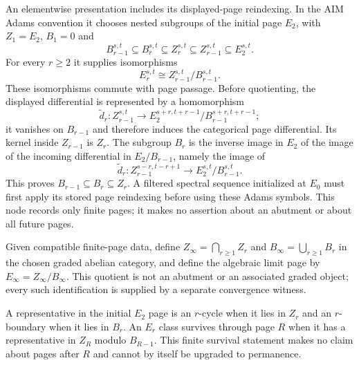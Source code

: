 \begin{definition}
  \label{def:ss-elementwise-page-presentation}
  \notready
  An elementwise presentation includes its displayed-page reindexing.  In the
  AIM Adams convention it chooses nested subgroups of the initial page
  $E_2$, with $Z_1=E_2$, $B_1=0$ and
  \[
    B_{r-1}^{s,t}\subseteq B_r^{s,t}\subseteq Z_r^{s,t}
      \subseteq Z_{r-1}^{s,t}\subseteq E_2^{s,t}.
  \]
  For every $r\ge2$ it supplies isomorphisms
  \[
    E_r^{s,t}\cong Z_{r-1}^{s,t}/B_{r-1}^{s,t}.
  \]
  These isomorphisms commute with page passage.  Before quotienting, the
  displayed differential is represented by a homomorphism
  \[
    \widetilde d_r:Z_{r-1}^{s,t}\longrightarrow
    E_2^{s+r,t+r-1}/B_{r-1}^{s+r,t+r-1};
  \]
  it vanishes on $B_{r-1}$ and therefore induces the categorical page
  differential.  Its kernel inside $Z_{r-1}$ is $Z_r$.  The subgroup $B_r$
  is the inverse image in $E_2$ of the image of the incoming differential in
  $E_2/B_{r-1}$, namely the image of
  \[
    \widetilde d_r:Z_{r-1}^{s-r,t-r+1}
      \longrightarrow E_2^{s,t}/B_{r-1}^{s,t}.
  \]
  This proves $B_{r-1}\subseteq B_r\subseteq Z_r$.
  A filtered spectral sequence initialized at $E_0$ must first apply its
  stored page reindexing before using these Adams symbols.  This node records
  only finite pages; it makes no assertion about an abutment or about all
  future pages.
\end{definition}

\begin{definition}
  \label{def:ss-einfty-presentation}
  \leanok
  Given compatible finite-page data, define
  $Z_\infty=\bigcap_{r\ge1}Z_r$ and
  $B_\infty=\bigcup_{r\ge1}B_r$ in the chosen graded abelian category, and
  define the algebraic limit page by $E_\infty=Z_\infty/B_\infty$.
  This quotient is not an abutment or an associated graded object; every such
  identification is supplied by a separate convergence witness.
\end{definition}

\begin{definition}
  \label{def:ss-cycle-boundary-survival}
  \notready
  A representative in the initial $E_2$ page is an $r$-cycle when it lies in
  $Z_r$ and an $r$-boundary when it lies in $B_r$.  An $E_r$ class survives
  through page $R$ when it has a representative in $Z_R$ modulo
  $B_{R-1}$.  This finite survival statement makes no claim about pages after
  $R$ and cannot by itself be upgraded to permanence.
\end{definition}

